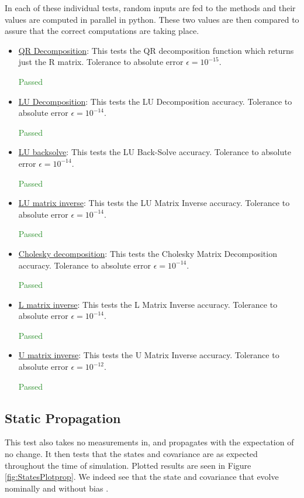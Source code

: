 \documentclass[]{BasiliskReportMemo}
\begin{document}
In each of these individual tests, random inputs are fed to the methods and their values are computed in parallel in python. These two values are then compared to assure that the correct computations are taking place. 
\begin{itemize}
\item \underline{QR Decomposition}: This tests the QR decomposition function which returns just the R matrix. Tolerance to absolute error $\epsilon = 10^{-15}$.

\textcolor{ForestGreen}{Passed}
\item \underline{LU Decomposition}: This tests the LU Decomposition accuracy. Tolerance to absolute error $\epsilon = 10^{-14}$.

\textcolor{ForestGreen}{Passed}
\item \underline{LU backsolve}: This tests the LU Back-Solve accuracy. Tolerance to absolute error $\epsilon = 10^{-14}$.

\textcolor{ForestGreen}{Passed}
\item \underline{LU matrix inverse}: This tests the LU Matrix Inverse accuracy. Tolerance to absolute error $\epsilon = 10^{-14}$.

\textcolor{ForestGreen}{Passed}
\item \underline{Cholesky decomposition}: This tests the Cholesky Matrix Decomposition accuracy. Tolerance to absolute error $\epsilon = 10^{-14}$.

\textcolor{ForestGreen}{Passed}
\item \underline{L matrix inverse}: This tests the L Matrix Inverse accuracy. Tolerance to absolute error $\epsilon = 10^{-14}$.

\textcolor{ForestGreen}{Passed}

\item \underline{U matrix inverse}: This tests the U Matrix Inverse accuracy. Tolerance to absolute error $\epsilon = 10^{-12}$.

\textcolor{ForestGreen}{Passed}
\end{itemize}

\subsection{Static Propagation}


%

This test also takes no measurements in, and propagates with the expectation of no change. It then tests that the states and covariance are as expected throughout the time of simulation. Plotted results are seen in Figure \ref{fig:StatesPlotprop}. We indeed see that the state and covariance that evolve nominally and without bias .
\end{document}
